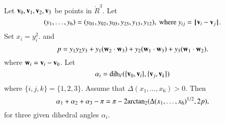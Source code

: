 \begin{lemma}\label{lemma:euler}
Let ${\mathbf v}_0,{\mathbf v}_1,{\mathbf v}_2,{\mathbf v}_3$ be points in $\ring{R}^3$. 
Let 
  $$(y_1,\ldots,y_6) =(y_{01},y_{02},y_{03},y_{23},y_{13},y_{12}),
   \text{ where } y_{ij}={\hskip0.1em|\hskip-0.15em|\hskip0.1em}{\mathbf v}_i - {\mathbf v}_j{\hskip0.1em|\hskip-0.15em|\hskip0.1em}.$$
Set
$x_i = y_i^2$.   
and
    $$
    p = y_1 y_2 y_3 + y_1 ({\mathbf w}_2\cdot {\mathbf w}_3) + y_2 ({\mathbf w}_1\cdot {\mathbf w}_3) + y_3
    ({\mathbf w}_1\cdot {\mathbf w}_2).
    $$
%
where ${\mathbf w}_i = {\mathbf v}_i- {\mathbf v}_0$.
Let $$\alpha_i =\operatorname{dih}_V(\{{\mathbf v}_0,{\mathbf v}_i\},\{{\mathbf v}_j,{\mathbf v}_k\})$$
where $\{i,j,k\}=\{1,2,3\}$.
Assume that $\Delta(x_1,\ldots,x_6)>0$. 
Then
    $$
    \alpha_1+\alpha_2+\alpha_3 - \pi
     = {\pi} - 2{\operatorname{arctan_2}}({\Delta(x_1,\ldots,x_6)^{1/2}},{2 p}),
    $$
for three given dihedral angles $\alpha_i$.
\end{lemma}
%

